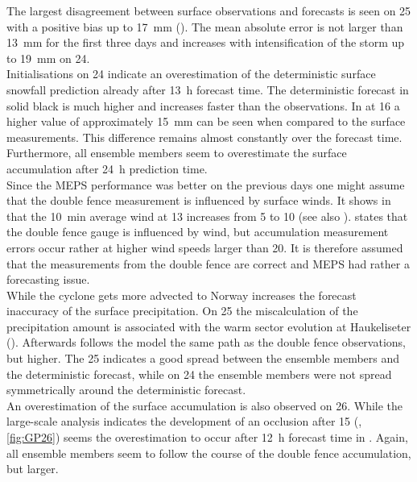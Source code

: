 The largest disagreement between surface observations and forecasts is seen on \SI{25}{\dec} with a positive bias up to \SI{17}{\mm} (). The mean absolute error is not larger than \SI{13}{\mm} for the first three days and increases with intensification of the storm up to \SI{19}{\mm} on \SI{24}{\dec}.
\\
Initialisations on \SI{24}{\dec} indicate an overestimation of the deterministic surface snowfall prediction already after \SI{13}{\hour} forecast time. The deterministic forecast in solid black is much higher and increases faster than the observations. In  at \SI{16}{\UTC} a higher value of approximately \SI{15}{\mm} can be seen when compared to the surface measurements. This difference remains almost constantly over the forecast time. Furthermore, all ensemble members seem to overestimate the surface accumulation after \SI{24}{\hour} prediction time. 
\\
Since the MEPS performance was better on the previous days one might assume that the double fence measurement is influenced by surface winds. It shows in  that the \SI{10}{\minute} average wind at \SI{13}{\UTC} increases from \SI{5}{\mPs} to \SI{10}{\mPs} (see also ). \citet{wolff_wmo_2018} states that the double fence gauge is influenced by wind, but accumulation measurement errors occur rather at higher wind speeds larger than \SI{20}{\mPs}. It is therefore assumed that the measurements from the double fence are correct and MEPS had rather a forecasting issue.
\\
While the cyclone gets more advected to Norway increases the forecast inaccuracy of the surface precipitation. 
On \SI{25}{\dec} the miscalculation of the precipitation amount is associated with the warm sector evolution at Haukeliseter (). Afterwards follows the model the same path as the double fence observations, but higher. The \SI{25}{\dec} indicates a good spread between the ensemble members and the deterministic forecast, while on \SI{24}{\dec} the ensemble members were not spread symmetrically around the deterministic forecast. 
\\
An overestimation of the surface accumulation is also observed on \SI{26}{\dec}. While the large-scale analysis indicates the development of an occlusion after \SI{15}{\UTC} (, \ref{fig:GP26}) seems the overestimation to occur after \SI{12}{\hour} forecast time in . Again, all ensemble members seem to follow the course of the double fence accumulation, but larger. 
